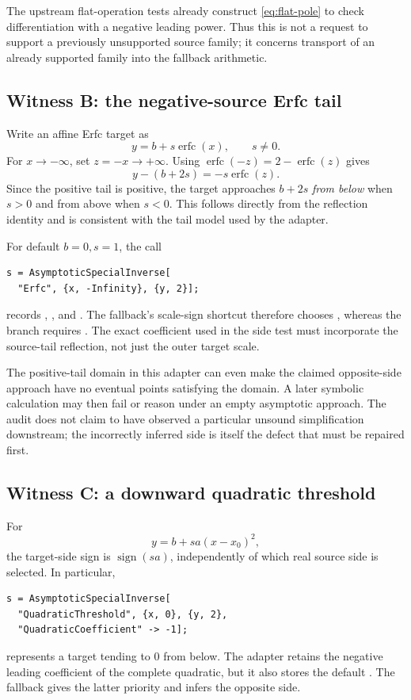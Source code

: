 The upstream flat-operation tests already construct \eqref{eq:flat-pole} to check differentiation with a negative leading power. Thus this is not a request to support a previously unsupported source family; it concerns transport of an already supported family into the fallback arithmetic.\cite{flattests}

\subsection{Witness B: the negative-source Erfc tail}

Write an affine Erfc target as
\[
 y=b+s\operatorname{erfc}(x),\qquad s\ne0.
\]
For $x\to-\infty$, set $z=-x\to+\infty$. Using $\operatorname{erfc}(-z)=2-\operatorname{erfc}(z)$ gives
\begin{equation}
 y-(b+2s)=-s\operatorname{erfc}(z).
\end{equation}
Since the positive tail is positive, the target approaches $b+2s$ \emph{from below} when $s>0$ and from above when $s<0$. This follows directly from the reflection identity and is consistent with the tail model used by the adapter.\cite{special,dlmf712}

For default $b=0,s=1$, the call
\begin{lstlisting}
s = AsymptoticSpecialInverse[
  "Erfc", {x, -Infinity}, {y, 2}];
\end{lstlisting}
records , , and . The fallback's scale-sign shortcut therefore chooses , whereas the branch requires . The exact coefficient used in the side test must incorporate the source-tail reflection, not just the outer target scale.\cite{special,envelope}

The positive-tail domain in this adapter can even make the claimed opposite-side approach have no eventual points satisfying the domain. A later symbolic calculation may then fail or reason under an empty asymptotic approach. The audit does not claim to have observed a particular unsound simplification downstream; the incorrectly inferred side is itself the defect that must be repaired first.

\subsection{Witness C: a downward quadratic threshold}

For
\[
 y=b+s a(x-x_0)^2,
\]
the target-side sign is $\operatorname{sign}(sa)$, independently of which real source side is selected. In particular,
\begin{lstlisting}
s = AsymptoticSpecialInverse[
  "QuadraticThreshold", {x, 0}, {y, 2},
  "QuadraticCoefficient" -> -1];
\end{lstlisting}
represents a target tending to $0$ from below. The adapter retains the negative leading coefficient of the complete quadratic, but it also stores the default . The fallback gives the latter priority and infers the opposite side.\cite{special,core,envelope}

